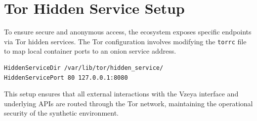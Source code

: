 \section{Tor Hidden Service Setup}
To ensure secure and anonymous access, the ecosystem exposes specific endpoints via Tor hidden services. The Tor configuration involves modifying the \texttt{torrc} file to map local container ports to an onion service address.

\begin{verbatim}
HiddenServiceDir /var/lib/tor/hidden_service/
HiddenServicePort 80 127.0.0.1:8080
\end{verbatim}

This setup ensures that all external interactions with the Vzeya interface and underlying APIs are routed through the Tor network, maintaining the operational security of the synthetic environment.
